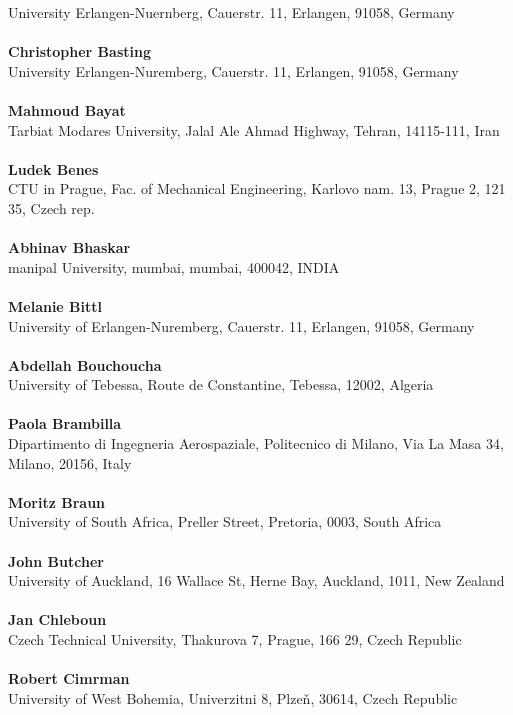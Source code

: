 University Erlangen-Nuernberg, Cauerstr. 11, Erlangen, 91058, Germany\\ 
\\ 
\textbf{Christopher Basting}
\\ 
University Erlangen-Nuremberg, Cauerstr. 11, Erlangen, 91058, Germany\\ 
\\ 
\textbf{Mahmoud Bayat}
\\ 
Tarbiat Modares University, Jalal Ale Ahmad Highway, Tehran, 14115-111, Iran\\ 
\\ 
\textbf{Ludek Benes}
\\ 
CTU in Prague, Fac. of Mechanical Engineering, Karlovo nam. 13, Prague 2, 121 35, Czech rep.\\ 
\\ 
\textbf{Abhinav Bhaskar}
\\ 
manipal University, mumbai, mumbai, 400042, INDIA\\ 
\\ 
\textbf{Melanie Bittl}
\\ 
University of Erlangen-Nuremberg, Cauerstr. 11, Erlangen, 91058, Germany\\ 
\\ 
\textbf{Abdellah Bouchoucha}
\\ 
University of Tebessa, Route de Constantine, Tebessa, 12002, Algeria\\ 
\\ 
\textbf{Paola Brambilla}
\\ 
Dipartimento di Ingegneria Aerospaziale, Politecnico di Milano, Via La Masa 34, Milano, 20156, Italy\\ 
\\ 
\textbf{Moritz Braun}
\\ 
University of South Africa, Preller Street, Pretoria, 0003, South Africa\\ 
\\ 
\textbf{John Butcher}
\\ 
University of Auckland, 16 Wallace St, Herne Bay, Auckland, 1011, New Zealand\\ 
\\ 
\textbf{Jan Chleboun}
\\ 
Czech Technical University, Thakurova 7, Prague, 166 29, Czech Republic\\ 
\\ 
\textbf{Robert Cimrman}
\\ 
University of West Bohemia, Univerzitni 8, Plze\v{n}, 30614, Czech Republic\\ 
